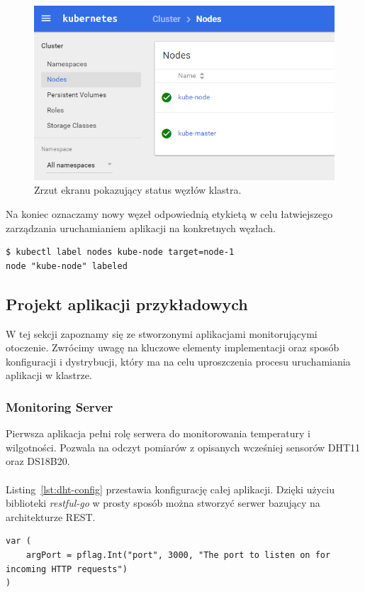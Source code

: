 \documentclass[12pt]{report}
\let\Oldsubsection\subsection
\renewcommand{\subsection}{\FloatBarrier\Oldsubsection}
\let\Oldsubsubsection\subsubsection
\renewcommand{\subsubsection}{\FloatBarrier\Oldsubsubsection}
\begin{document}
{\begin{figure}[h]
	\centering
	\includegraphics[width=1\textwidth]{images/node_status.png}
	\caption{Zrzut ekranu pokazujący status węzłów klastra.}
\end{figure}
\FloatBarrier

Na koniec oznaczamy nowy węzeł odpowiednią etykietą w celu łatwiejszego zarządzania uruchamianiem aplikacji na konkretnych węzłach.

\begin{lstlisting}
$ kubectl label nodes kube-node target=node-1
node "kube-node" labeled
\end{lstlisting}

\subsection{Projekt aplikacji przykładowych}
W tej sekcji zapoznamy się ze stworzonymi aplikacjami monitorującymi otoczenie. Zwrócimy uwagę na kluczowe elementy implementacji oraz sposób konfiguracji i dystrybucji, który ma na celu uproszczenia procesu uruchamiania aplikacji w klastrze.

\subsubsection{Monitoring Server} \label{subsect:monitoring-server}
Pierwsza aplikacja pełni rolę serwera do monitorowania temperatury i wilgotności. Pozwala na odczyt pomiarów z opisanych wcześniej sensorów DHT11 oraz DS18B20. \\ \\
Listing~\ref{lst:dht-config} przestawia konfigurację całej aplikacji. Dzięki użyciu biblioteki \textit{restful-go} w prosty sposób można stworzyć serwer bazujący na architekturze REST.
\begin{lstlisting}[language=golang,caption=Konfiguracja aplikacji,label=lst:dht-config]
var (
	argPort = pflag.Int("port", 3000, "The port to listen on for incoming HTTP requests")
)


\end{lstlisting}}
\end{document}
